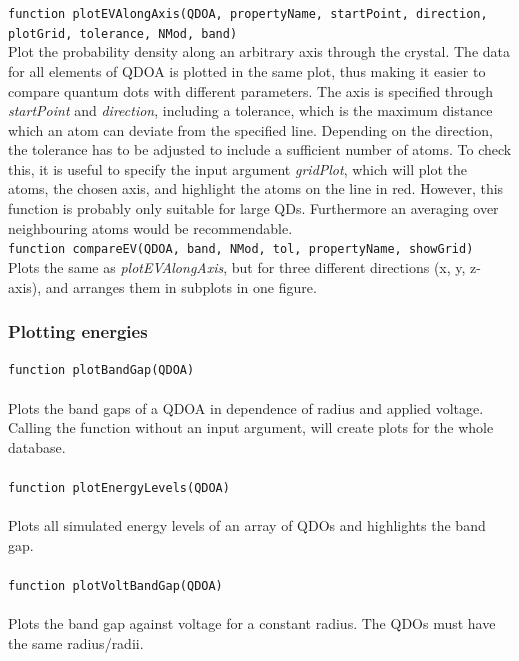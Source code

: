 			\lstinline{function plotEVAlongAxis(QDOA, propertyName, startPoint, direction, plotGrid, tolerance, NMod, band)}\\
			
			Plot the probability density along an arbitrary axis through the crystal. The data for all elements of QDOA is plotted in the same plot, thus making it easier to compare quantum dots with different parameters. The axis is specified through \textit{startPoint} and \textit{direction}, including a tolerance, which is  the maximum distance which an atom can deviate from the specified line. Depending on the direction, the tolerance has to be adjusted to include  a sufficient number of atoms. To check this, it is useful to specify the input argument \textit{gridPlot}, which will plot the atoms, the chosen axis, and highlight  the atoms on the line in red. However, this function is probably only suitable for large QDs. Furthermore an averaging over neighbouring atoms  would be recommendable.\\ 
			 
			\lstinline{function compareEV(QDOA, band, NMod, tol, propertyName, showGrid)}\\
			
			Plots the same as \textit{plotEVAlongAxis}, but for three different directions (x, y, z-axis), and arranges them in subplots in one figure.

			\subsubsection{Plotting energies}
				\lstinline{function plotBandGap(QDOA)} \\\\
    		Plots the band gaps of a \gls{QDOA} in dependence of radius and applied voltage. Calling the function without an input argument,
    		will create plots for the whole database.\\\\
    		
    		\lstinline{function plotEnergyLevels(QDOA)}\\\\
    		Plots all simulated energy levels of an array of \glspl{QDO} and highlights the band gap.\\\\
    		
    		\lstinline{function plotVoltBandGap(QDOA)}\\\\
    		Plots the band gap against voltage for a constant radius. The \glspl{QDO} must have the same radius/radii.
				
